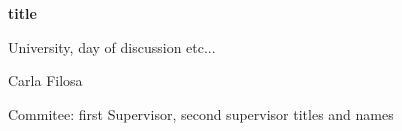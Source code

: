 \begin{center}
\begin{large}
\vspace*{3cm}
\textbf{title}

\vspace*{2cm}


\vspace*{1.5cm}
University, day of discussion etc...






\vspace*{1.5cm}


\vspace*{1.5cm}

Carla Filosa

\vspace*{1.5cm}


\end{large}
\end{center}

\clearpage
\thispagestyle{plain}
\begin{large}
\noindent Commitee: first Supervisor, second supervisor titles and names\\
\vspace{0.4cm}\\
\vspace{0.4cm}\\

\vspace*{10cm}
\end{large}
\clearpage

